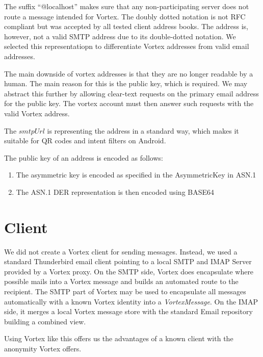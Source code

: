 The suffix ``@localhost'' makes sure that any non-participating server does not route a message intended for Vortex. The doubly dotted notation is not RFC compliant but was accepted by all tested client address books. The address is, however, not a valid SMTP address due to its double-dotted notation. We selected this representatiopn to differentiate Vortex addresses from valid email addresses.

The main downside of vortex addresses is that they are no longer readable by a human. The main reason for this is the public key, which is required. We may abstract this further by allowing clear-text requests on the primary email address for the public key. The vortex account must then answer such requests with the valid Vortex address.

The $smtpUrl$ is representing the address in a standard way, which makes it suitable for QR codes and intent filters on Android.

The public key of an address is encoded as follows:
\begin{enumerate}
	\item The asymmetric key is encoded as specified in the AsymmetricKey in ASN.1
	\item The ASN.1 DER representation is then encoded using BASE64
\end{enumerate}    

\section{Client}
We did not create a Vortex client for sending messages. Instead, we used a standard Thunderbird email client pointing to a local SMTP and IMAP Server provided by a Vortex proxy. On the SMTP side, Vortex does encapsulate where possible mails into a Vortex message and builds an automated route to the recipient. The SMTP part of Vortex may be used to encapsulate all messages automatically with a known Vortex identity into a \emph{VortexMessage}. On the IMAP side, it merges a local Vortex message store with the standard Email repository building a combined view.

Using Vortex like this offers us the advantages of a known client with the anonymity Vortex offers.

